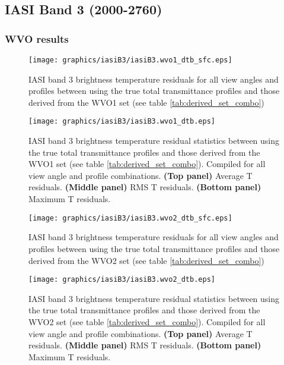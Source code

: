 \subsection{IASI Band 3 (2000-2760\invcm)}

\subsubsection{WVO results}
\begin{figure}[htp]
  \centering
  \texttt{[image: graphics/iasiB3/iasiB3.wvo1\_dtb\_sfc.eps]}
  \caption{IASI band 3 brightness temperature residuals for all view angles and profiles between using the true total transmittance profiles and those derived from the WVO1 set (see table \ref{tab:derived_set_combo})}
  \label{fig:iasiB3.wvo1_dtb_sfc}
  \vspace{1em}
  \texttt{[image: graphics/iasiB3/iasiB3.wvo1\_dtb.eps]}
  \caption{IASI band 3 brightness temperature residual statistics between using the true total transmittance profiles and those derived from the WVO1 set (see table \ref{tab:derived_set_combo}). Compiled for all view angle and profile combinations. \textbf{(Top panel)} Average T residuals. \textbf{(Middle panel)} RMS T residuals. \textbf{(Bottom panel)} Maximum T residuals.}
  \label{fig:iasiB3.wvo1_dtb}
\end{figure}

\begin{figure}[htp]
  \centering
  \texttt{[image: graphics/iasiB3/iasiB3.wvo2\_dtb\_sfc.eps]}
  \caption{IASI band 3 brightness temperature residuals for all view angles and profiles between using the true total transmittance profiles and those derived from the WVO2 set (see table \ref{tab:derived_set_combo})}
  \label{fig:iasiB3.wvo2_dtb_sfc}
  \vspace{1em}
  \texttt{[image: graphics/iasiB3/iasiB3.wvo2\_dtb.eps]}
  \caption{IASI band 3 brightness temperature residual statistics between using the true total transmittance profiles and those derived from the WVO2 set (see table \ref{tab:derived_set_combo}). Compiled for all view angle and profile combinations. \textbf{(Top panel)} Average T residuals. \textbf{(Middle panel)} RMS T residuals. \textbf{(Bottom panel)} Maximum T residuals.}
  \label{fig:iasiB3.wvo2_dtb}
\end{figure}

